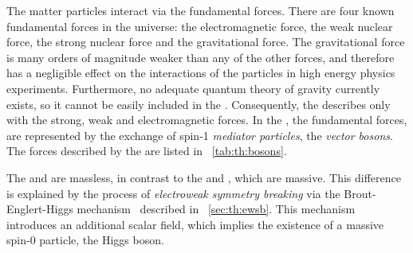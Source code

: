 The matter particles interact via the fundamental forces. There are four known fundamental forces in the universe: the electromagnetic force, the weak nuclear force, the strong nuclear force and the gravitational force. The gravitational force is many orders of magnitude weaker than any of the other forces, and therefore has a negligible effect on the interactions of the \SM particles in high energy physics experiments. Furthermore, no adequate quantum theory of gravity currently exists, so it cannot be easily included in the \SM. Consequently, the \SM describes only with the strong, weak and electromagnetic forces. In the \SM, the fundamental forces, are represented by the exchange of spin-1 \emph{mediator particles}, the \emph{vector bosons}. 
The forces described by the \SM are listed in \Tab~\ref{tab:th:bosons}.

\begin{table}[h!]
 \caption[The three fundamental forces described by the SM. The mediator particle of each force is indicated along with its measured mass, where the uncertainties have been omitted\quad\cite{Thomson:2013zua,PDGBooklet}.]{The three fundamental forces described by the SM. The mediator particle of each force is indicated along with its measured mass, where the uncertainties have been omitted~\cite{Thomson:2013zua,PDGBooklet}.}
\label{tab:th:bosons}
  \end{table}

The \Pphoton and \Pgluon are massless, in contrast to the \PWpm and \PZ, which are massive. This difference is explained by the process of \emph{electroweak symmetry breaking} via the Brout-Englert-Higgs mechanism~\cite{Englert:1964et,Higgs:1964ia,Higgs:1964pj,Guralnik:1964eu,Higgs:1966ev,Kibble:1967sv} described in \Sec~\ref{sec:th:ewsb}. This mechanism introduces an additional scalar field, which implies the existence of a massive spin-$0$ particle, the Higgs boson.

